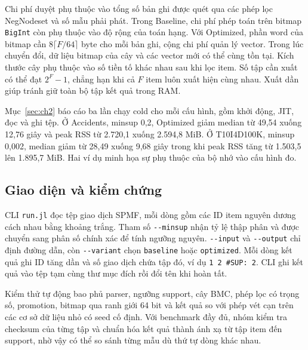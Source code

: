 Chi phí duyệt phụ thuộc vào tổng số bản ghi được quét qua các phép lọc NegNodeset và số mẫu phải phát. Trong Baseline, chi phí phép toán trên bitmap \texttt{BigInt} còn phụ thuộc vào độ rộng của toán hạng. Với Optimized, phần word của bitmap cần \(8\lceil F/64\rceil\) byte cho mỗi bản ghi, cộng chi phí quản lý vector. Trong lúc chuyển đổi, dữ liệu bitmap của cây và các vector mới có thể cùng tồn tại. Kích thước cây phụ thuộc vào số tiền tố khác nhau sau khi lọc item. Số tập cần xuất có thể đạt \(2^F-1\), chẳng hạn khi cả \(F\) item luôn xuất hiện cùng nhau. Xuất dần giúp tránh giữ toàn bộ tập kết quả trong RAM.

Mục~\ref{sec:ch2} báo cáo ba lần chạy cold cho mỗi cấu hình, gồm khởi động, JIT, đọc và ghi tệp. Ở Accidents, minsup 0,2, Optimized giảm median từ 49,54 xuống 12,76 giây và peak RSS từ 2.720,1 xuống 2.594,8 MiB. Ở T10I4D100K, minsup 0,002, median giảm từ 28,49 xuống 9,68 giây trong khi peak RSS tăng từ 1.503,5 lên 1.895,7 MiB. Hai ví dụ minh họa sự phụ thuộc của bộ nhớ vào cấu hình đo.

\subsection{Giao diện và kiểm chứng}

CLI \texttt{run.jl} đọc tệp giao dịch SPMF, mỗi dòng gồm các ID item nguyên dương cách nhau bằng khoảng trắng. Tham số \texttt{-\/-minsup} nhận tỷ lệ thập phân và được chuyển sang phân số chính xác để tính ngưỡng nguyên. \texttt{-\/-input} và \texttt{-\/-output} chỉ định đường dẫn, còn \texttt{-\/-variant} chọn \texttt{baseline} hoặc \texttt{optimized}. Mỗi dòng kết quả ghi ID tăng dần và số giao dịch chứa tập đó, ví dụ \texttt{1\ 2\ \#SUP:\ 2}. CLI ghi kết quả vào tệp tạm cùng thư mục đích rồi đổi tên khi hoàn tất.

Kiểm thử tự động bao phủ parser, ngưỡng support, cây BMC, phép lọc có trọng số, promotion, bitmap qua ranh giới 64 bit và kết quả so với phép vét cạn trên các cơ sở dữ liệu nhỏ có seed cố định. Với benchmark đầy đủ, nhóm kiểm tra checksum của từng tập và chuẩn hóa kết quả thành ánh xạ từ tập item đến support, nhờ vậy có thể so sánh từng mẫu dù thứ tự dòng khác nhau.

